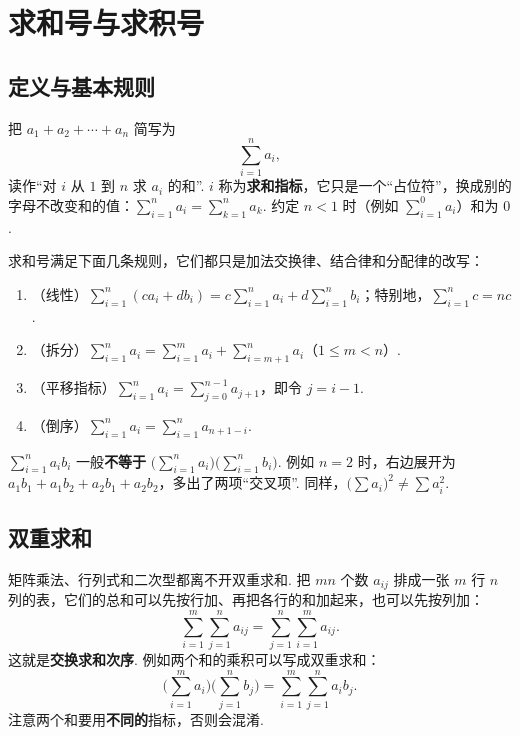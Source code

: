 \section{求和号与求积号}\label{app:sum}

\subsection{定义与基本规则}

把 $a_1+a_2+\cdots+a_n$ 简写为
\[\sum_{i=1}^n a_i,\]
读作“对 $i$ 从 $1$ 到 $n$ 求 $a_i$ 的和”. $i$ 称为\textbf{求和指标}，它只是一个“占位符”，换成别的字母不改变和的值：$\sum_{i=1}^na_i=\sum_{k=1}^na_k$. 约定 $n<1$ 时（例如 $\sum_{i=1}^0a_i$）和为 $0$.

求和号满足下面几条规则，它们都只是加法交换律、结合律和分配律的改写：
\begin{enumerate}
	\item （线性）$\displaystyle\sum_{i=1}^n(ca_i+db_i)=c\sum_{i=1}^na_i+d\sum_{i=1}^nb_i$；特别地，$\displaystyle\sum_{i=1}^nc=nc$.
	\item （拆分）$\displaystyle\sum_{i=1}^na_i=\sum_{i=1}^ma_i+\sum_{i=m+1}^na_i$（$1\le m<n$）.
	\item （平移指标）$\displaystyle\sum_{i=1}^na_i=\sum_{j=0}^{n-1}a_{j+1}$，即令 $j=i-1$.
	\item （倒序）$\displaystyle\sum_{i=1}^na_i=\sum_{i=1}^na_{n+1-i}$.
\end{enumerate}

\begin{pitfallbox}
	$\displaystyle\sum_{i=1}^na_ib_i$ 一般\textbf{不等于} $\displaystyle\Big(\sum_{i=1}^na_i\Big)\Big(\sum_{i=1}^nb_i\Big)$. 例如 $n=2$ 时，右边展开为 $a_1b_1+a_1b_2+a_2b_1+a_2b_2$，多出了两项“交叉项”. 同样，$\Big(\sum a_i\Big)^2\ne\sum a_i^2$.
\end{pitfallbox}

\subsection{双重求和}

矩阵乘法、行列式和二次型都离不开双重求和. 把 $mn$ 个数 $a_{ij}$ 排成一张 $m$ 行 $n$ 列的表，它们的总和可以先按行加、再把各行的和加起来，也可以先按列加：
\[\sum_{i=1}^m\sum_{j=1}^na_{ij}=\sum_{j=1}^n\sum_{i=1}^ma_{ij}.\]
这就是\textbf{交换求和次序}. 例如两个和的乘积可以写成双重求和：
\[\Big(\sum_{i=1}^ma_i\Big)\Big(\sum_{j=1}^nb_j\Big)=\sum_{i=1}^m\sum_{j=1}^na_ib_j.\]
注意两个和要用\textbf{不同的}指标，否则会混淆.

